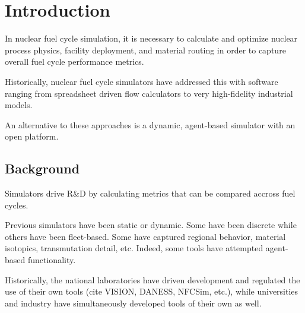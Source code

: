 
\section{Introduction}


In nuclear fuel cycle simulation, it is necessary to calculate and optimize 
nuclear process physics, facility deployment, and material routing in order to 
capture overall fuel cycle performance metrics. 

Historically, nuclear fuel cycle simulators have addressed this with software 
ranging from spreadsheet driven flow calculators to very high-fidelity industrial 
models. 

An alternative to these approaches is a dynamic, agent-based simulator with an 
open platform.

\subsection{Background}



Simulators drive R\&D by calculating metrics that can be compared accross fuel 
cycles. 

Previous simulators have been static or dynamic. Some have been discrete while 
others have been fleet-based. Some have captured regional behavior, material 
isotopics, transmutation detail, etc. Indeed, some tools have attempted 
agent-based functionality.

Historically, the national laboratories have driven development and regulated 
the use of their own tools (cite VISION, DANESS, NFCSim, etc.), while 
universities and industry have simultaneously developed tools of their own as 
well. 


